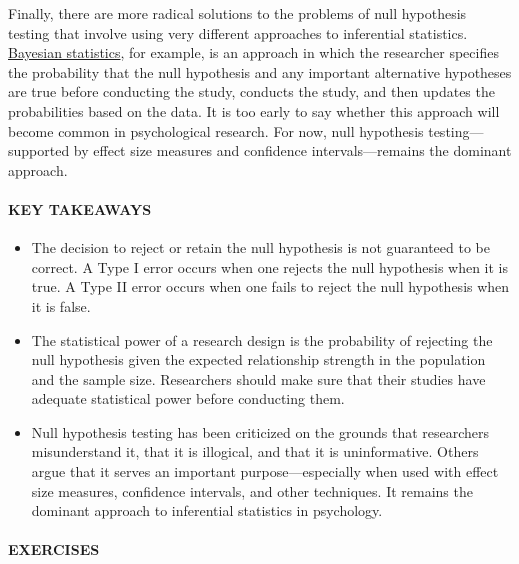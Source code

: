 \documentclass[
]{krantz}
\providecommand{\tightlist}{%
  \setlength{\itemsep}{0pt}\setlength{\parskip}{0pt}}
\begin{document}
Finally, there are more radical solutions to the problems of null hypothesis testing that involve using very different approaches to inferential statistics. \hyperref[bayesian-statistics]{Bayesian statistics}, for example, is an approach in which the researcher specifies the probability that the null hypothesis and any important alternative hypotheses are true before conducting the study, conducts the study, and then updates the probabilities based on the data. It is too early to say whether this approach will become common in psychological research. For now, null hypothesis testing---supported by effect size measures and confidence intervals---remains the dominant approach.

\paragraph*{KEY TAKEAWAYS}\label{key-takeaways-38}

\begin{itemize}
\tightlist
\item
  The decision to reject or retain the null hypothesis is not guaranteed to be correct. A Type I error occurs when one rejects the null hypothesis when it is true. A Type II error occurs when one fails to reject the null hypothesis when it is false.
\item
  The statistical power of a research design is the probability of rejecting the null hypothesis given the expected relationship strength in the population and the sample size. Researchers should make sure that their studies have adequate statistical power before conducting them.
\item
  Null hypothesis testing has been criticized on the grounds that researchers misunderstand it, that it is illogical, and that it is uninformative. Others argue that it serves an important purpose---especially when used with effect size measures, confidence intervals, and other techniques. It remains the dominant approach to inferential statistics in psychology.
\end{itemize}

\paragraph*{EXERCISES}\label{exercises-30}
\end{document}
